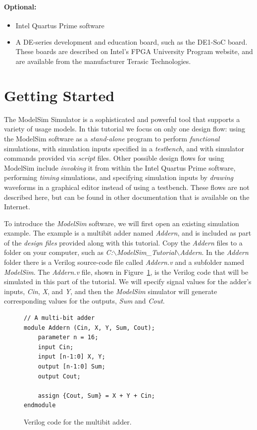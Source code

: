 \documentclass[11pt, twoside, pdftex]{article}
\begin{document}
{\bf Optional:}
\begin{itemize}
\item Intel Quartus\textsuperscript{\textregistered} Prime software
\item A DE-series development and education board, such as the DE1-SoC board. These boards are 
described on Intel's FPGA University Program website, and are available from the manufacturer 
Terasic Technologies.
\end{itemize}

\clearpage
\newpage
\section{Getting Started}

The ModelSim Simulator is a sophisticated and powerful tool that supports a variety of 
usage models. In this tutorial we focus on only one design flow: using the ModelSim
software as a {\it stand-alone} program to perform {\it functional} simulations, with 
simulation inputs specified in a {\it testbench}, and with simulator commands provided 
via {\it script} files. Other possible design flows for using ModelSim include {\it invoking}
it from within the Intel Quartus Prime software, performing {\it timing} simulations, and
specifying simulation inputs by {\it drawing} waveforms in a graphical editor instead of
using a testbench. These flows are not described here, but can be found in other
documentation that is available on the Internet.  

\noindent
To introduce the {\it ModelSim} software, we will first open an existing simulation example.
The example is a multibit adder named {\it Addern}, and is included as 
part of the {\it design files} provided
along with this tutorial. Copy the {\it Addern} files to a folder on your computer, such
as {\it C:$\backslash$ModelSim\_Tutorial$\backslash$Addern}. In the {\it Addern} folder
there is a Verilog source-code file called {\it Addern.v} and a subfolder named {\it ModelSim}.
The {\it Addern.v} file, shown in Figure~\ref{fig:addern}, is the Verilog code that will 
be simulated in this part of the tutorial. We will specify signal 
values for the adder's inputs, {\it Cin}, {\it X}, and {\it Y}, and then the {\it
ModelSim} simulator will generate corresponding values for the outputs, {\it Sum} and {\it Cout}.

\lstset{language=Verilog,numbers=none,escapechar=|}
\begin{figure}[h]
\begin{center}
\begin{minipage}[t]{12.5 cm}
\begin{lstlisting}[name=addern]
// A multi-bit adder
module Addern (Cin, X, Y, Sum, Cout);
    parameter n = 16;
    input Cin;
    input [n-1:0] X, Y;
    output [n-1:0] Sum;
    output Cout;

    assign {Cout, Sum} = X + Y + Cin;
endmodule
\end{lstlisting}
\end{minipage}
\caption{Verilog code for the multibit adder.}
\label{fig:addern}
\end{center}
\end{figure}
\end{document}
